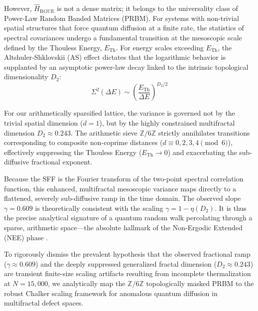 \documentclass[aps,prl,preprint,superscriptaddress,floatfix]{revtex4-2}
\newcommand{\Zmod}{\mathbb{Z}/6\mathbb{Z}}
\begin{document}
However, $\hat{H}_{\text{RGUE}}$ is not a dense matrix; it belongs to the universality class of Power-Law Random Banded Matrices (PRBM). For systems with non-trivial spatial structures that force quantum diffusion at a finite rate, the statistics of spectral covariances undergo a fundamental transition at the mesoscopic scale defined by the Thouless Energy, $E_{\text{Th}}$. For energy scales exceeding $E_{\text{Th}}$, the Altshuler-Shklovskii (AS) effect dictates that the logarithmic behavior is supplanted by an asymptotic power-law decay linked to the intrinsic topological dimensionality $D_2$:
\begin{equation}
\Sigma^2(\Delta E) \sim \left( \frac{E_{\text{Th}}}{\Delta E} \right)^{D_2/2}
\end{equation}

For our arithmetically sparsified lattice, the variance is governed not by the trivial spatial dimension ($d=1$), but by the highly constrained multifractal dimension $D_2 \approx 0.243$. The arithmetic sieve $\Zmod$ strictly annihilates transitions corresponding to composite non-coprime distances ($d \equiv 0,2,3,4 \pmod 6$), effectively suppressing the Thouless Energy ($E_{\text{Th}} \to 0$) and exacerbating the sub-diffusive fractional exponent.

Because the SFF is the Fourier transform of the two-point spectral correlation function, this enhanced, multifractal mesoscopic variance maps directly to a flattened, severely sub-diffusive ramp in the time domain. The observed slope $\gamma = 0.609$ is theoretically consistent with the scaling $\gamma = 1 - \eta(D_2)$. It is thus the precise analytical signature of a quantum random walk percolating through a sparse, arithmetic space—the absolute hallmark of the Non-Ergodic Extended (NEE) phase \cite{Kravtsov2015, Khaymovich2020, GarciaGarcia2024}.

To rigorously dismiss the prevalent hypothesis that the observed fractional ramp ($\gamma \approx 0.609$) and the deeply suppressed generalized fractal dimension ($D_2 \approx 0.243$) are transient finite-size scaling artifacts resulting from incomplete thermalization at $N=15,000$, we analytically map the $\Zmod$ topologically masked PRBM to the robust Chalker scaling framework for anomalous quantum diffusion in multifractal defect spaces.
\end{document}
